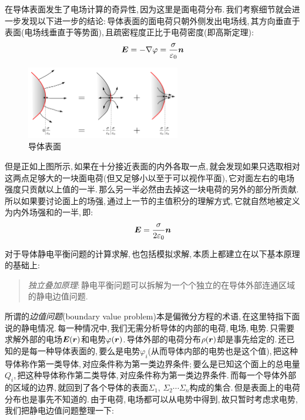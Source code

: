 在导体表面发生了电场计算的奇异性,\,因为这里是面电荷分布.\,我们考察细节就会进一步发现以下进一步的结论:\,导体表面的面电荷只朝外侧发出电场线,\,其方向垂直于表面(电场线垂直于等势面),\,且疏密程度正比于电荷密度(即高斯定理):
\[\boldsymbol{E}=-\nabla\varphi=\frac{\sigma}{\varepsilon_0}\boldsymbol{n}\]

\begin{figure}[H]
\centering
\includegraphics[width=0.6\textwidth]{image/7-2-3.png}
\caption{导体表面}
\end{figure}

但是正如上图所示,\,如果在十分接近表面的内外各取一点,\,就会发现如果只选取相对这两点足够大的一块面电荷(但又足够小以至于可以视作平面),\,它对面左右的电场强度只贡献以上值的一半.\,那么另一半必然由去掉这一块电荷的另外的部分所贡献.\,所以如果要讨论面上的场强,\,通过上一节的主值积分的理解方式,\,它就自然地被定义为内外场强和的一半,\,即:
\[\boldsymbol{E}=\frac{\sigma}{2\varepsilon_0}\boldsymbol{n}\]

对于导体静电平衡问题的计算求解,\,也包括模拟求解,\,本质上都建立在以下基本原理的基础上:

\begin{verse}
\emph{独立叠加原理}:\,静电平衡问题可以拆解为一个个独立的在导体外部连通区域的静电边值问题.
\end{verse}

所谓的\emph{边值问题}(boundary value problem)本是偏微分方程的术语,\,在这里特指下面说的静电情况.\,每一种情况中,\,我们无需分析导体的内部的电荷,\,电场,\,电势.\,只需要求解外部的电场$\boldsymbol{E}(\boldsymbol{r})$和电势$\varphi(\boldsymbol{r})$.\,导体外部的电荷分布$\rho(\boldsymbol{r})$却是事先给定的.\,还已知的是每一种导体表面的,\,要么是电势$\varphi_i$(从而导体内部的电势也是这个值),\,把这种导体称作第一类导体,\,对应条件称为第一类边界条件;\,要么是已知这个面上的总电量$Q_i$,\,把这种导体称作第二类导体,\,对应条件称为第一类边界条件.\,而每一个导体外部的区域的边界,\,就回到了各个导体的表面$\Sigma_1,\,\Sigma_2\cdots\Sigma_n$构成的集合.\,但是表面上的电荷分布也是事先不知道的.\,由于电荷,\,电场都可以从电势中得到,\,故只暂时考虑求电势,\,我们把静电边值问题整理一下:

